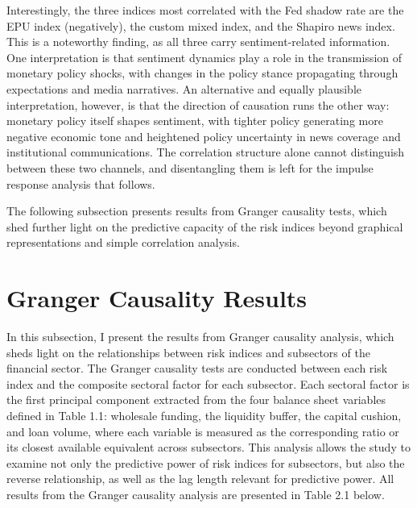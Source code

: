 \documentclass[12pt,a4paper]{report}
\begin{document}
Interestingly, the three indices most correlated with the Fed shadow rate are the EPU index (negatively), the custom mixed index, and the Shapiro news index. This is a noteworthy finding, as all three carry sentiment-related information. One interpretation is that sentiment dynamics play a role in the transmission of monetary policy shocks, with changes in the policy stance propagating through expectations and media narratives. An alternative and equally plausible interpretation, however, is that the direction of causation runs the other way: monetary policy itself shapes sentiment, with tighter policy generating more negative economic tone and heightened policy uncertainty in news coverage and institutional communications. The correlation structure alone cannot distinguish between these two channels, and disentangling them is left for the impulse response analysis that follows.

The following subsection presents results from Granger causality tests, which shed further light on the predictive capacity of the risk indices beyond graphical representations and simple correlation analysis.

\section{Granger Causality Results}
In this subsection, I present the results from Granger causality analysis, which sheds light on the relationships between risk indices and subsectors of the financial sector. The Granger causality tests are conducted between each risk index and the composite sectoral factor for each subsector. Each sectoral factor is the first principal component extracted from the four balance sheet variables defined in Table 1.1: wholesale funding, the liquidity buffer, the capital cushion, and loan volume, where each variable is measured as the corresponding ratio or its closest available equivalent across subsectors. This analysis allows the study to examine not only the predictive power of risk indices for subsectors, but also the reverse relationship, as well as the lag length relevant for predictive power. All results from the Granger causality analysis are presented in Table 2.1 below.
\end{document}

